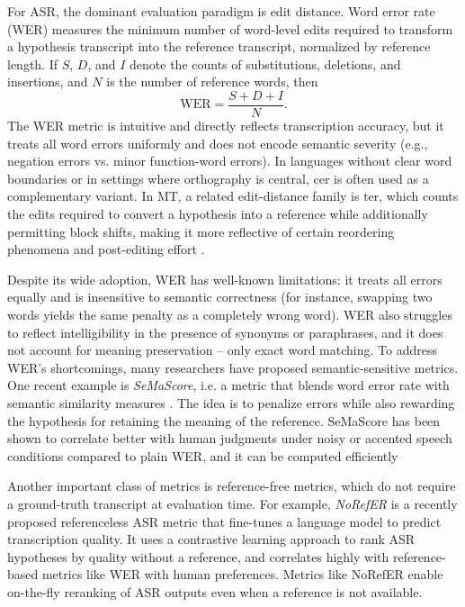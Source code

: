 For ASR, the dominant evaluation paradigm is edit distance. Word error rate (WER) measures the minimum number of word-level edits required to transform a hypothesis transcript into the reference transcript, normalized by reference length. If $S$, $D$, and $I$ denote the counts of substitutions, deletions, and insertions, and $N$ is the number of reference words, then
\begin{equation}
\mathrm{WER} = \frac{S + D + I}{N}.
\end{equation}
The WER metric is intuitive and directly reflects transcription accuracy, but it treats all word errors uniformly and does not encode semantic severity (e.g., negation errors vs. minor function-word errors). In languages without clear word boundaries or in settings where orthography is central, \gls{cer} is often used as a complementary variant. In MT, a related edit-distance family is \gls{ter}, which counts the edits required to convert a hypothesis into a reference while additionally permitting block shifts, making it more reflective of certain reordering phenomena and post-editing effort \cite{snover-etal-2006-ter}.

Despite its wide adoption, WER has well-known limitations: it treats all errors equally and is insensitive to semantic correctness (for instance, swapping two words yields the same penalty as a completely wrong word). WER also struggles to reflect intelligibility in the presence of synonyms or paraphrases, and it does not account for meaning preservation -- only exact word matching. To address WER's shortcomings, many researchers have proposed semantic-sensitive metrics. One recent example is \emph{SeMaScore}, i.e. a metric that blends word error rate with semantic similarity measures \cite{semascore_2024}. The idea is to penalize errors while also rewarding the hypothesis for retaining the meaning of the reference. SeMaScore has been shown to correlate better with human judgments under noisy or accented speech conditions compared to plain WER, and it can be computed efficiently

Another important class of metrics is reference-free metrics, which do not require a ground-truth transcript at evaluation time. For example, \emph{NoRefER} is a recently proposed referenceless ASR metric that fine-tunes a language model to predict transcription quality. It uses a contrastive learning approach to rank ASR hypotheses by quality without a reference, and correlates highly with reference-based metrics like WER with human preferences\cite{norefer_2023_arxiv}. Metrics like NoRefER enable on-the-fly reranking of ASR outputs even when a reference is not available.



